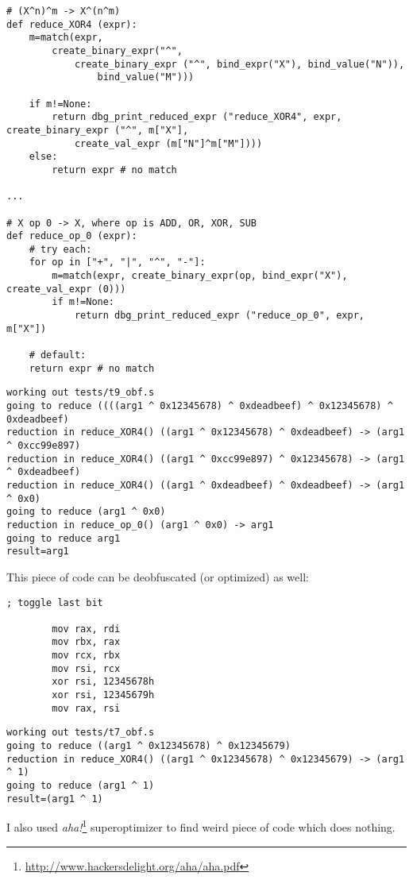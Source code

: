 \begin{lstlisting}
# (X^n)^m -> X^(n^m)
def reduce_XOR4 (expr):
    m=match(expr, 
        create_binary_expr("^",
            create_binary_expr ("^", bind_expr("X"), bind_value("N")),
                bind_value("M")))
    
    if m!=None:
        return dbg_print_reduced_expr ("reduce_XOR4", expr, create_binary_expr ("^", m["X"], 
            create_val_expr (m["N"]^m["M"])))
    else:
        return expr # no match

...

# X op 0 -> X, where op is ADD, OR, XOR, SUB
def reduce_op_0 (expr):
    # try each:
    for op in ["+", "|", "^", "-"]:
        m=match(expr, create_binary_expr(op, bind_expr("X"), create_val_expr (0)))
        if m!=None:
            return dbg_print_reduced_expr ("reduce_op_0", expr, m["X"])

    # default:
    return expr # no match
\end{lstlisting}

\begin{lstlisting}
working out tests/t9_obf.s
going to reduce ((((arg1 ^ 0x12345678) ^ 0xdeadbeef) ^ 0x12345678) ^ 0xdeadbeef)
reduction in reduce_XOR4() ((arg1 ^ 0x12345678) ^ 0xdeadbeef) -> (arg1 ^ 0xcc99e897)
reduction in reduce_XOR4() ((arg1 ^ 0xcc99e897) ^ 0x12345678) -> (arg1 ^ 0xdeadbeef)
reduction in reduce_XOR4() ((arg1 ^ 0xdeadbeef) ^ 0xdeadbeef) -> (arg1 ^ 0x0)
going to reduce (arg1 ^ 0x0)
reduction in reduce_op_0() (arg1 ^ 0x0) -> arg1
going to reduce arg1
result=arg1
\end{lstlisting}

This piece of code can be deobfuscated (or optimized) as well:

\begin{lstlisting}
; toggle last bit

        mov rax, rdi
        mov rbx, rax
        mov rcx, rbx
        mov rsi, rcx
        xor rsi, 12345678h
        xor rsi, 12345679h
        mov rax, rsi
\end{lstlisting}

\begin{lstlisting}
working out tests/t7_obf.s
going to reduce ((arg1 ^ 0x12345678) ^ 0x12345679)
reduction in reduce_XOR4() ((arg1 ^ 0x12345678) ^ 0x12345679) -> (arg1 ^ 1)
going to reduce (arg1 ^ 1)
result=(arg1 ^ 1)
\end{lstlisting}

I also used \textit{aha!}\footnote{\url{http://www.hackersdelight.org/aha/aha.pdf}} superoptimizer to find weird piece of code which does nothing.

